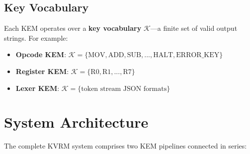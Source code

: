 \documentclass[11pt]{article}
\begin{document}
\subsection{Key Vocabulary}

Each KEM operates over a \textbf{key vocabulary} $\mathcal{K}$---a finite set of valid output strings. For example:

\begin{itemize}
    \item \textbf{Opcode KEM}: $\mathcal{K} = \{\text{MOV}, \text{ADD}, \text{SUB}, ..., \text{HALT}, \text{ERROR\_KEY}\}$
    \item \textbf{Register KEM}: $\mathcal{K} = \{\text{R0}, \text{R1}, ..., \text{R7}\}$
    \item \textbf{Lexer KEM}: $\mathcal{K} = \{\text{token stream JSON formats}\}$
\end{itemize}

\section{System Architecture}

The complete KVRM system comprises two KEM pipelines connected in series:
\end{document}
